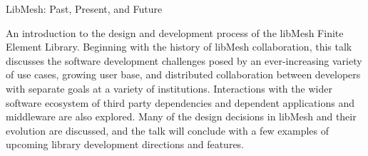 LibMesh: Past, Present, and Future

An introduction to the design and development process of the libMesh
Finite Element Library.  Beginning with the history of libMesh
collaboration, this talk discusses the software development challenges
posed by an ever-increasing variety of use cases, growing user base,
and distributed collaboration between developers with separate goals
at a variety of institutions.  Interactions with the wider software
ecosystem of third party dependencies and dependent applications and
middleware are also explored.  Many of the design decisions in
libMesh and their evolution are discussed, and the talk will conclude
with a few examples of upcoming library development directions and
features.
